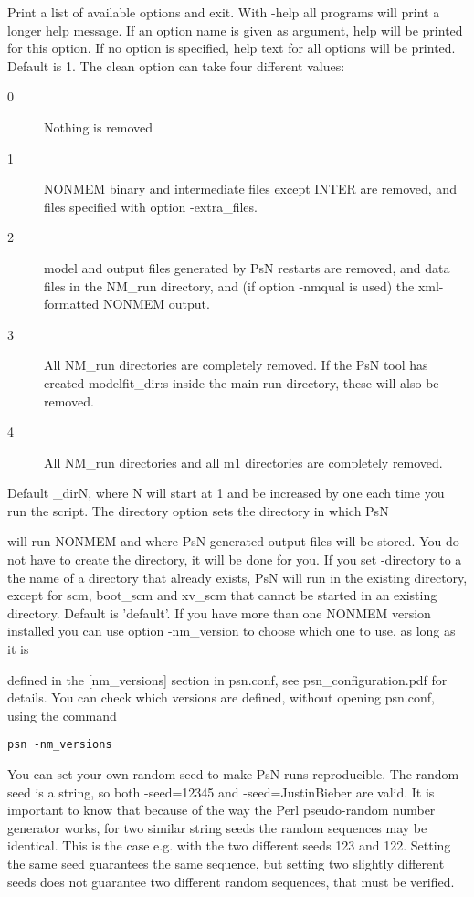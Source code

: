 \begin{optionlist}
Print a list of available options and exit. 
\nextopt
{}
With -help all programs will print a longer help message. If an option name is given as argument, help will be printed for this option. If no option is specified, help text for all options will be printed. 
\nextopt
{}
Default is 1. The clean option can take four different values:  
\begin{description}
	\item[0] Nothing is removed 
	\item[1] NONMEM binary and intermediate files except INTER are removed, and files specified with option -extra\_files. 
	\item[2] model and output files generated by PsN restarts are removed, and data files in the NM\_run directory, and (if option -nmqual is used) the xml-formatted NONMEM output. 
	\item[3] All NM\_run directories are completely removed. If the PsN tool has created modelfit\_dir:s inside the main run directory, these  will also be removed. 
	\item[4] All NM\_run directories and all m1 directories are completely removed.
\end{description}
\nextopt
{}

Default \guidetoolname\_dirN,
where N will start at 1 and be increased by one each time you run the script. The directory option sets the directory in which PsN 

will run NONMEM and where PsN-generated output files will be stored. You do not have to create the directory,  it will be done for you. If you set -directory to a the name of a directory that already exists, PsN will run in the existing directory, except for scm, boot\_scm and xv\_scm that cannot be started in an existing directory.
\nextopt
{}
Default is 'default'. 
If you have more than one NONMEM version installed you can use option -nm\_version to choose which one to use, as long as it is 

defined in the [nm\_versions] section in psn.conf, see psn\_configuration.pdf for details. You can check which versions are defined, without opening psn.conf, using the command

\begin{verbatim}
psn -nm_versions
\end{verbatim}
\nextopt
{}
You can set your own random seed to make PsN runs reproducible. The random seed is a string, so both -seed=12345 and -seed=JustinBieber are valid. It is important to know that because of the way the Perl pseudo-random number generator works, for two similar string seeds the random sequences may be identical. This is the case e.g. with the two different seeds 123 and 122. 
Setting the same seed guarantees the same sequence, but setting two slightly different seeds does not guarantee two different random sequences, that must be verified.
\nextopt


\end{optionlist}
